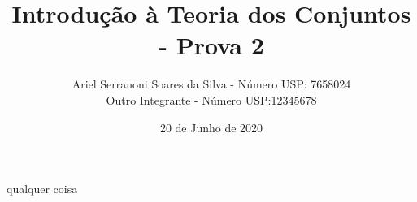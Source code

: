 \documentclass[a4paper]{article}
\title{Introdução à Teoria dos Conjuntos - Prova 2}
\author{Ariel Serranoni Soares da Silva  - Número USP: 7658024\\
Outro Integrante - Número USP:12345678}
\date{20 de Junho de 2020}
\begin{document}
\maketitle

qualquer coisa
\end{document}
